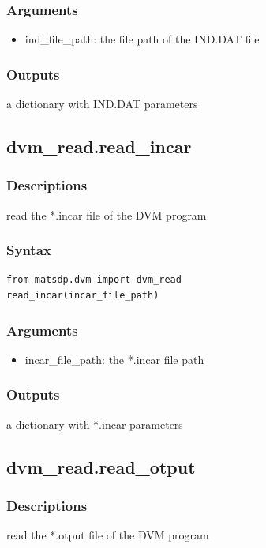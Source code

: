 \documentclass[12pt]{book}
\begin{document}
\subsubsection{Arguments}
\begin{itemize}
\item ind\_file\_path: the file path of the IND.DAT file
\end{itemize}

\subsubsection{Outputs}
a dictionary with IND.DAT parameters


\subsection{dvm\_read.read\_incar}

\subsubsection{Descriptions}
read the *.incar file of the DVM program
\subsubsection{Syntax}
\begin{lstlisting}
from matsdp.dvm import dvm_read
read_incar(incar_file_path)
\end{lstlisting}

\subsubsection{Arguments}
\begin{itemize}
\item incar\_file\_path: the *.incar file path
\end{itemize}

\subsubsection{Outputs}
a dictionary with *.incar parameters


\subsection{dvm\_read.read\_otput}

\subsubsection{Descriptions}
read the *.otput file of the DVM program
\end{document}
